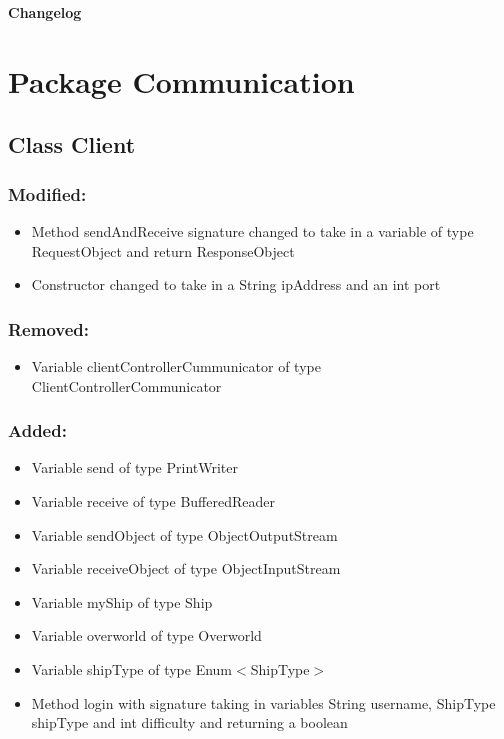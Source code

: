 \documentclass{article}
\begin{document}
\textbf{Changelog}


\section{Package Communication}


\subsection{Class Client}

\subsubsection{Modified:}
\begin{itemize}
\item Method sendAndReceive signature changed to take in a variable of type RequestObject and return ResponseObject
\item Constructor changed to take in a String ipAddress and an int port
\end{itemize}

\subsubsection{Removed:}
\begin{itemize}
\item Variable clientControllerCummunicator of type ClientControllerCommunicator
\end{itemize}

\subsubsection{Added:}
\begin{itemize}
\item Variable send of type PrintWriter
\item Variable receive of type BufferedReader
\item Variable sendObject of type ObjectOutputStream
\item Variable receiveObject of type ObjectInputStream
\item Variable myShip of type Ship
\item Variable overworld of type Overworld
\item Variable shipType of type Enum$<$ShipType$>$
\item Method login with signature taking in variables String username, ShipType shipType and int difficulty and returning a boolean
\end{itemize}
\end{document}
